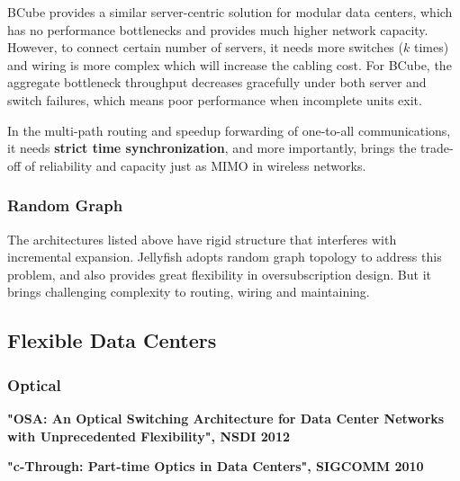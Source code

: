 \documentclass[journal,onecolumn,11pt]{IEEEtran}
\begin{document}
BCube provides a similar server-centric solution for modular data centers, which has no performance bottlenecks and provides much higher network capacity. However, to connect certain number of servers, it needs more switches ($k$ times) and wiring is more complex which will increase the cabling cost. For BCube, the aggregate bottleneck throughput decreases gracefully under both server and switch failures, which means poor performance when incomplete units exit.

In the multi-path routing and speedup forwarding of one-to-all communications, it needs \textbf{strict time synchronization}, and more importantly, brings the trade-off of reliability and capacity just as MIMO in wireless networks.

%
%

\subsubsection{Random Graph}

The architectures listed above have rigid structure that interferes with incremental expansion. Jellyfish adopts random graph topology to address this problem, and also provides great flexibility in oversubscription design. But it brings challenging complexity to routing, wiring and maintaining.

\subsection{Flexible Data Centers}

\subsubsection{Optical}

\textbf{"OSA: An Optical Switching Architecture for Data Center Networks with Unprecedented Flexibility", NSDI 2012}

\textbf{"c-Through: Part-time Optics in Data Centers", SIGCOMM 2010}
\end{document}
